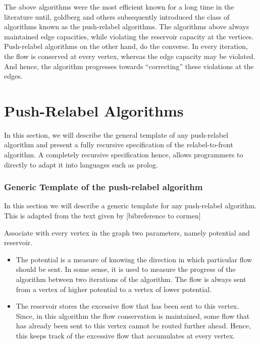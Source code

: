 \documentclass[BTech]{iitmdiss}
\begin{document}
	    The above algorithms were the most efficient known for a long time in the literature until, goldberg and others subsequently introduced the 
	    class of algorithms known as the push-relabel algorithms. The algorithms above always maintained edge capacities, while violating the 
	    reservoir capacity at the vertices. Push-relabel algorithms on the other hand, do the converse. In every iteration, the flow is 
	    conserved at every vertex, whereas the edge capacity may be violated. And hence, the algorithm progresses towards ``correcting'' these violations
	    at the edges. \\
	    
	   \section{Push-Relabel Algorithms}
	      In this section, we will describe the general template of any push-relabel algorithm and present a fully recursive specification
	      of the relabel-to-front algorithm. A completely recursive specification hence, allows programmers to directly to adapt it into languages
	      such as prolog. \\
	      
	      
	      \subsubsection{Generic Template of the push-relabel algorithm}
	      In this section we will describe a generic template for any push-relabel algorithm. This is adapted from the text given by 
	      [bibreference to cormen]
	      
	      Associate with every vertex in the graph two parameters, namely potential and reservoir.
	      \begin{itemize}
	       \item 
		  The potential is a measure of knowing the direction in which particular flow should be sent.
	      In some sense, it is used to measure the progress of the algorithm between two iterations of the algorithm.
	      The flow is always sent from a vertex of higher potential to a vertex of lower potential. \\
	      
	      \item
		  The reservoir stores the excessive flow that has been sent to this vertex. Since, in this algorithm the flow conservation is maintained,
		  some flow that has already been sent to this vertex cannot be routed further ahead. Hence, this keeps track of the excessive flow 
		  that accumulates at every vertex. \\
		  
		  
	      \end{itemize}
\end{document}
